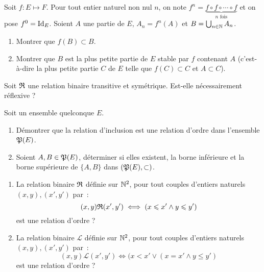 \begin{exercice}
    Soit \(f : E \longmapsto F\). Pour tout entier naturel non nul \(n\), on note \(f^n = \underbrace{f \circ f \circ \cdots \circ f}_{n \textrm{ fois}}\) et on pose \(f^0=\operatorname{Id}_E\). Soient \(A\) une partie de \(E\), \(A_n=f^{n}(A)\) et \(B = \bigcup_{n\in \mathbb{N}} A_n\).
    \begin{enumerate}
        \item Montrer que \(f(B) \subset B\).
        \item Montrer que \(B\) est la plus petite partie de \(E\) stable par \(f\) contenant \(A\) (c'est-à-dire la plus petite partie \(C\) de \(E\) telle que \(f(C) \subset C\) et \(A \subset C\)).
    \end{enumerate}
\end{exercice}
\begin{exercice}
    Soit \(\mathfrak{R}\) une relation binaire transitive et symétrique. Est-elle nécessairement réflexive ?
\end{exercice}
\begin{exercice}
    Soit un ensemble quelconque \(E\).
    \begin{enumerate}
        \item Démontrer que la relation d'inclusion est une relation d'ordre dans l'ensemble \(\mathfrak{P}(E)\).
        \item Soient \(A, B \in \mathfrak{P}(E)\), déterminer si elles existent, la borne inférieure et la borne supérieure de \(\{A, B\}\) dans \((\mathfrak{P}(E), \subset)\).
    \end{enumerate}
\end{exercice}
\begin{exercice}
    \begin{enumerate}
        \item La relation binaire \(\mathfrak{R}\) définie sur \(\mathbb{N}^2\), pour tout couples d'entiers naturels \((x,y), (x',y')\) par~: \[(x,y)\mathfrak{R}{}(x',y') \iff (x \leqslant x' \land y \leqslant y')\] est une relation d'ordre ?
        \item La relation binaire \(\mathcal{L}\) définie sur \(\mathbb{N}^2\), pour tout couples d'entiers naturels \((x,y), (x',y')\) par~: \[(x,y)\mathcal{L}(x',y') \iff (x < x' \lor (x=x' \land y \leqslant y')\] est une relation d'ordre ?
    \end{enumerate}
\end{exercice}
